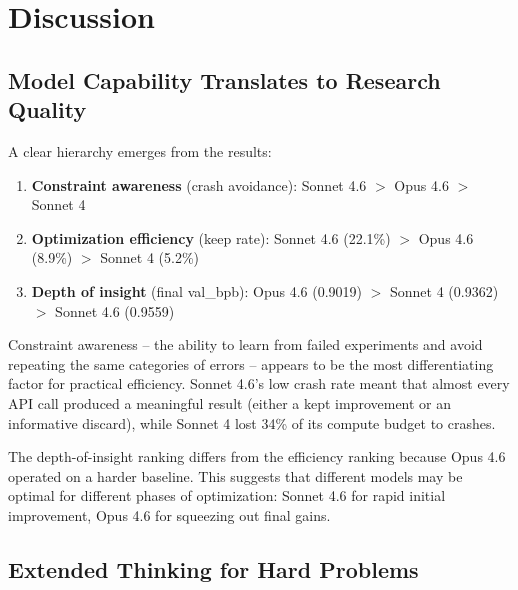 \documentclass[11pt]{article}
\begin{document}
\section{Discussion}
\label{sec:discussion}

\subsection{Model Capability Translates to Research Quality}
\label{sec:capability}

A clear hierarchy emerges from the results:

\begin{enumerate}[leftmargin=*]
    \item \textbf{Constraint awareness} (crash avoidance): Sonnet 4.6 $>$ Opus 4.6 $>$ Sonnet 4
    \item \textbf{Optimization efficiency} (keep rate): Sonnet 4.6 (22.1\%) $>$ Opus 4.6 (8.9\%) $>$ Sonnet 4 (5.2\%)
    \item \textbf{Depth of insight} (final val\_bpb): Opus 4.6 (0.9019) $>$ Sonnet 4 (0.9362) $>$ Sonnet 4.6 (0.9559)
\end{enumerate}

Constraint awareness -- the ability to learn from failed experiments and avoid repeating the same categories of errors -- appears to be the most differentiating factor for practical efficiency. Sonnet 4.6's low crash rate meant that almost every API call produced a meaningful result (either a kept improvement or an informative discard), while Sonnet 4 lost 34\% of its compute budget to crashes.

The depth-of-insight ranking differs from the efficiency ranking because Opus 4.6 operated on a harder baseline. This suggests that different models may be optimal for different phases of optimization: Sonnet 4.6 for rapid initial improvement, Opus 4.6 for squeezing out final gains.

\subsection{Extended Thinking for Hard Problems}
\label{sec:thinking}
\end{document}
